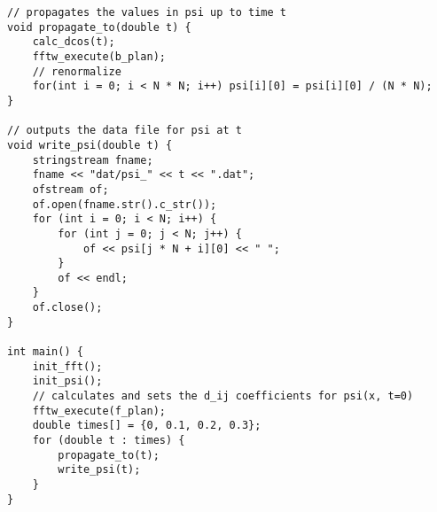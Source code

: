\documentclass[12pt]{article}
\begin{document}
\begin{lstlisting}
// propagates the values in psi up to time t
void propagate_to(double t) {
    calc_dcos(t);
    fftw_execute(b_plan);
    // renormalize
    for(int i = 0; i < N * N; i++) psi[i][0] = psi[i][0] / (N * N);
}

// outputs the data file for psi at t
void write_psi(double t) {
    stringstream fname;
    fname << "dat/psi_" << t << ".dat";
    ofstream of;
    of.open(fname.str().c_str());
    for (int i = 0; i < N; i++) {
        for (int j = 0; j < N; j++) {
            of << psi[j * N + i][0] << " ";
        }
        of << endl;
    }
    of.close();
}

int main() {
    init_fft();
    init_psi();
    // calculates and sets the d_ij coefficients for psi(x, t=0)
    fftw_execute(f_plan);
    double times[] = {0, 0.1, 0.2, 0.3};
    for (double t : times) {
        propagate_to(t);
        write_psi(t);
    }
}
\end{lstlisting}
\end{document}
